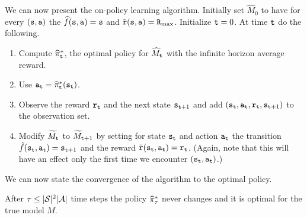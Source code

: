 We can now present the on-policy learning algorithm.
%
Initially set $\widehat{M}_0$ to have for every $({\tt s},{\tt a})$
the $\widehat{f}({\tt s},{\tt a})={\tt s}$ and
$\tilde{{\tt r}}({\tt s},{\tt a})={\tt R}_{\max }$. Initialize ${\tt t}=0$. At
time ${\tt t}$ do the following.
\begin{enumerate}
\item
Compute $\widehat{\pi}^*_{\tt t}$, the optimal policy for
$\widehat{M}_{\tt t}$ with the infinite horizon average reward.
\item
Use ${\tt a}_{\tt t}=\widehat{\pi}^*_{\tt t}({\tt s}_{{\tt t}})$.
\item
Observe the reward ${\tt r}_{\tt t}$ and the next state
${\tt s}_{{\tt t}+1}$ and add
$({\tt s}_{\tt t},{\tt a}_{\tt t},{\tt r}_{\tt t},{\tt s}_{{\tt t}+1})$ to
the observation set.
\item
Modify $\widetilde{M}_{\tt t}$ to  $\widetilde{M}_{{\tt t}+1}$
by setting for state ${\tt s}_{\tt t}$ and action ${\tt a}_{\tt t}$ the
transition $\tilde{f}({\tt s}_{\tt t},{\tt a}_{\tt t})={\tt s}_{{\tt t}+1}$
and the reward
$\tilde{{\tt r}}({\tt s}_{\tt t},{\tt a}_{\tt t})={\tt r}_{\tt t}$.
(Again, note that this will have an effect only the first time we
encounter $({\tt s}_{\tt t},{\tt a}_{\tt t})$.)
%
\end{enumerate}





We can now state the convergence of the algorithm to the optimal
policy.

\begin{theorem}
After $\tau\leq|\mathcal{S}|^2|\mathcal{A}|$ time steps the policy
$\widehat{\pi}^*_\tau$ never changes and it is optimal for the true model $M$.
\end{theorem}

